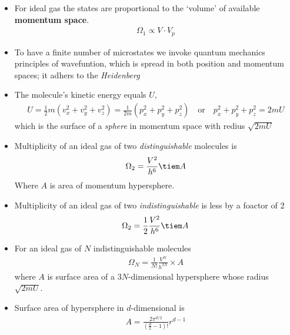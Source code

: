 \documentclass{book}
\begin{document}
\begin{itemize}

	\item For ideal gas the states are proportional to the `volume' of available \textbf{momentum space}.
	      \begin{align*}
		      \Omega_1 \propto V \cdot V_p
	      \end{align*}

	\item To have a finite number of microstates we invoke quantum mechanics principles of wavefuntion,
	      which is spread in both position and momentum spaces; it adhers to the \textit{Heidenberg}

	\item The molecule's kinetic energy equals $U$,
	      \begin{align}
		      U = \frac{1}{2} m (v_x^2 + v_y^2 + v_z^2) = \frac{1}{2m} (p_x^2  + p_y^2 + p_z^2)
		      \quad \text{or} \quad p_x^2  + p_y^2 + p_z^2 = 2m U
	      \end{align}
	      which is the surface of a \textit{sphere} in momentum space with redius $\sqrt{2mU}$

	\item Multiplicity of an ideal gas of two \textit{distinguishable} molecules is
	      \begin{align}
		      \Omega_2 = \frac{V^2}{h^6} \tiem A
	      \end{align}
	      Where $A$ is area of momentum hypersphere.

	\item Multiplicity of an ideal gas of two \textit{indistinguishable} is less by
	      a foactor of 2
	      \begin{align}
		      \Omega_2 = \frac{1}{2} \frac{V^2}{h^6} \tiem A
	      \end{align}


	\item For an ideal gas of $N$ indistinguishable molecules
	      \begin{align}
		      \Omega_N = \frac{1}{N!} \frac{V^N}{h^{3N}} \times A
	      \end{align}
	      where $A$ is surface area of a $3N$-dimensional hypersphere whose radius $\sqrt{2mU}$.

	\item Surface area of hypersphere in $d$-dimensional is
	      \begin{align}
		      A = \frac{2\pi^{d/2}}{(\frac{d}{2} - 1)!} r^{d-1}
	      \end{align}


\end{itemize}
\end{document}
